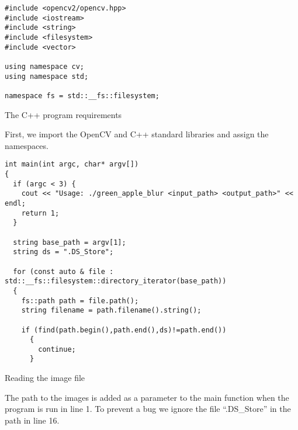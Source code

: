
\begin{listing}[!ht]
\begin{verbatim}
#include <opencv2/opencv.hpp>
#include <iostream>
#include <string>
#include <filesystem>
#include <vector>

using namespace cv;
using namespace std;

namespace fs = std::__fs::filesystem;
\end{verbatim}
\caption{The C++ program requirements}
\label{listing:c++requirements}
\end{listing}

First, we import the OpenCV and C++ standard libraries and assign the namespaces.

\begin{listing}[ht]
\begin{verbatim}
int main(int argc, char* argv[])
{
  if (argc < 3) {
    cout << "Usage: ./green_apple_blur <input_path> <output_path>" << endl;
    return 1;
  }

  string base_path = argv[1];
  string ds = ".DS_Store";

  for (const auto & file : std::__fs::filesystem::directory_iterator(base_path))
  {
    fs::path path = file.path();
    string filename = path.filename().string();

    if (find(path.begin(),path.end(),ds)!=path.end())
      {
        continue;
      }

\end{verbatim}
\caption{Reading the image file}
\label{listing:c++-read}
\end{listing}

The path to the images is added as a parameter to the main function when the program is run in line 1. To prevent a bug we ignore the file “.DS\_Store” in the path in line 16.

